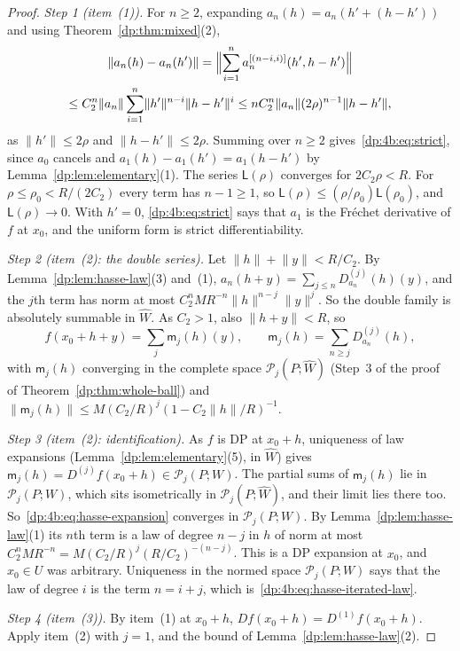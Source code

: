 \documentclass[11pt]{amsart}
\theoremstyle{definition}
\theoremstyle{remark}
\numberwithin{equation}{section}
\newcommand{\norm}[1]{\lVert #1\rVert}
\theoremstyle{plain}
\theoremstyle{definition}
\theoremstyle{plain}
\newcommand{\cP}{\mathcal P}
\begin{document}
\begin{proof}
\emph{Step 1 (item~(1)).} For $n\ge2$, expanding $a_n(h)=a_n(h'+(h-h'))$ and using Theorem~\ref{dp:thm:mixed}(2),
\begin{multline*}
 \norm{a_n(h)-a_n(h')}=\Bigl\lVert\sum_{i=1}^na_n^{[(n-i,i)]}(h',h-h')\Bigr\rVert\\
 \le C_2^n\norm{a_n}\sum_{i=1}^n\norm{h'}^{n-i}\norm{h-h'}^i\le nC_2^n\norm{a_n}(2\rho)^{n-1}\norm{h-h'},
\end{multline*}
as $\norm{h'}\le2\rho$ and $\norm{h-h'}\le2\rho$. Summing over $n\ge2$ gives~\eqref{dp:4b:eq:strict}, since $a_0$ cancels and $a_1(h)-a_1(h')=a_1(h-h')$ by Lemma~\ref{dp:lem:elementary}(1). The series $\mathsf L(\rho)$ converges for $2C_2\rho<R$. For $\rho\le\rho_0<R/(2C_2)$ every term has $n-1\ge1$, so $\mathsf L(\rho)\le(\rho/\rho_0)\mathsf L(\rho_0)$, and $\mathsf L(\rho)\to0$. With $h'=0$, \eqref{dp:4b:eq:strict} says that $a_1$ is the Fr\'echet derivative of $f$ at $x_0$, and the uniform form is strict differentiability.

\emph{Step 2 (item~(2): the double series).} Let $\norm h+\norm y<R/C_2$. By Lemma~\ref{dp:lem:hasse-law}(3) and~(1), $a_n(h+y)=\sum_{j\le n}D^{(j)}_{a_n}(h)(y)$, and the $j$th term has norm at most $C_2^nMR^{-n}\norm h^{n-j}\norm y^j$. So the double family is absolutely summable in $\widehat W$. As $C_2>1$, also $\norm{h+y}<R$, so
\[
 f(x_0+h+y)=\sum_j\mathsf m_j(h)(y),\qquad \mathsf m_j(h)=\sum_{n\ge j}D^{(j)}_{a_n}(h),
\]
with $\mathsf m_j(h)$ converging in the complete space $\cP_j(P;\widehat W)$ (Step~3 of the proof of Theorem~\ref{dp:thm:whole-ball}) and $\norm{\mathsf m_j(h)}\le M(C_2/R)^j(1-C_2\norm h/R)^{-1}$.

\emph{Step 3 (item~(2): identification).} As $f$ is DP at $x_0+h$, uniqueness of law expansions (Lemma~\ref{dp:lem:elementary}(5), in $\widehat W$) gives $\mathsf m_j(h)=D^{(j)}f(x_0+h)\in\cP_j(P;W)$. The partial sums of $\mathsf m_j(h)$ lie in $\cP_j(P;W)$, which sits isometrically in $\cP_j(P;\widehat W)$, and their limit lies there too. So~\eqref{dp:4b:eq:hasse-expansion} converges in $\cP_j(P;W)$. By Lemma~\ref{dp:lem:hasse-law}(1) its $n$th term is a law of degree $n-j$ in $h$ of norm at most $C_2^nMR^{-n}=M(C_2/R)^j(R/C_2)^{-(n-j)}$. This is a DP expansion at $x_0$, and $x_0\in U$ was arbitrary. Uniqueness in the normed space $\cP_j(P;W)$ says that the law of degree $i$ is the term $n=i+j$, which is~\eqref{dp:4b:eq:hasse-iterated-law}.

\emph{Step 4 (item~(3)).} By item~(1) at $x_0+h$, $Df(x_0+h)=D^{(1)}f(x_0+h)$. Apply item~(2) with $j=1$, and the bound of Lemma~\ref{dp:lem:hasse-law}(2).


\end{proof}
\end{document}
